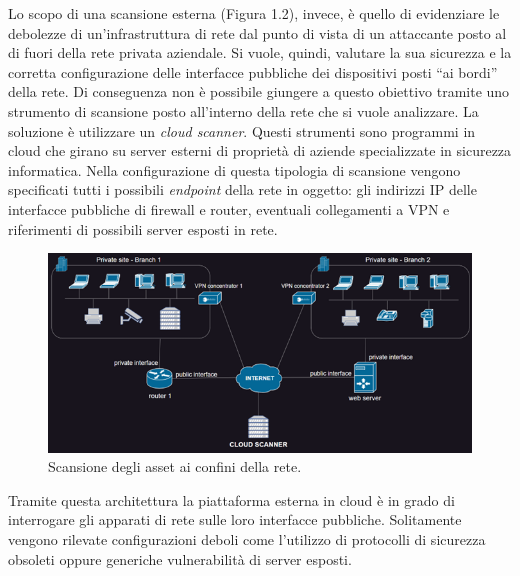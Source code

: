 \documentclass[target=mst,aauheader=]{thud}
\begin{document}
Lo scopo di una scansione esterna (Figura 1.2), invece, è quello di evidenziare le debolezze di un’infrastruttura di rete dal punto di vista di un attaccante posto al di fuori della rete privata aziendale. Si vuole, quindi, valutare la sua sicurezza e la corretta configurazione delle interfacce pubbliche dei dispositivi posti “ai bordi” della rete. Di conseguenza non è possibile giungere a questo obiettivo tramite uno strumento di scansione posto all’interno della rete che si vuole analizzare. La soluzione è utilizzare un \textit{cloud scanner}. Questi strumenti sono programmi in cloud che girano su server esterni di proprietà di aziende specializzate in sicurezza informatica. Nella configurazione di questa tipologia di scansione vengono specificati tutti i possibili \textit{endpoint} della rete in oggetto: gli indirizzi IP delle interfacce pubbliche di firewall e router, eventuali collegamenti a VPN e riferimenti di possibili server esposti in rete.


\begin{figure}[h]
\centering
\includegraphics[scale=1.2]{images/scan_esterna.png}
    \caption{Scansione degli asset ai confini della rete.}
\end{figure}


Tramite questa architettura la piattaforma esterna in cloud è in grado di interrogare gli apparati di rete sulle loro interfacce pubbliche. Solitamente vengono rilevate configurazioni deboli come l’utilizzo di protocolli di sicurezza obsoleti oppure generiche vulnerabilità di server esposti.
\end{document}
